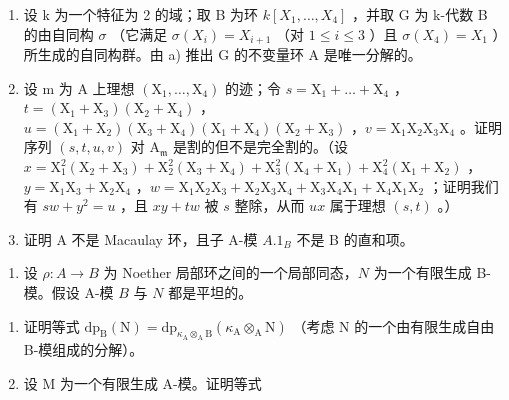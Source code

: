 \begin{enumerate}
\def\labelenumi{\alph{enumi})}
\setcounter{enumi}{1}
\item
  设 k 为一个特征为 2 的域；取 B 为环 \(k[X_{1},\ldots,X_{4}]\) ，并取 G 为 k-代数 B 的由自同构 \(\sigma\) （它满足 \(\sigma(X_{i})=X_{i+1}\) （对 \(1\leqslant i\leqslant3\) ）且 \(\sigma(X_{4})=X_{1}\) ）所生成的自同构群。由 a) 推出 G 的不变量环 A 是唯一分解的。
\item
  设 m 为 \(\mathrm{A}\) 上理想 \((\mathrm{X}_1, \ldots, \mathrm{X}_4)\) 的迹；令 \(s = \mathrm{X}_1 + \ldots + \mathrm{X}_4\) ，\(t = (\mathrm{X}_1 + \mathrm{X}_3)(\mathrm{X}_2 + \mathrm{X}_4)\) ，\(u = (\mathrm{X}_1 + \mathrm{X}_2)(\mathrm{X}_3 + \mathrm{X}_4)(\mathrm{X}_1 + \mathrm{X}_4)(\mathrm{X}_2 + \mathrm{X}_3)\) ，\(v = \mathrm{X}_1\mathrm{X}_2\mathrm{X}_3\mathrm{X}_4\) 。证明序列 \((s, t, u, v)\) 对 \(\mathrm{A}_{\mathfrak{m}}\) 是割的但不是完全割的。（设 \(x = \mathrm{X}_1^2(\mathrm{X}_2 + \mathrm{X}_3) + \mathrm{X}_2^2(\mathrm{X}_3 + \mathrm{X}_4) + \mathrm{X}_3^2(\mathrm{X}_4 + \mathrm{X}_1) + \mathrm{X}_4^2(\mathrm{X}_1 + \mathrm{X}_2)\) ，\(y = \mathrm{X}_1\mathrm{X}_3 + \mathrm{X}_2\mathrm{X}_4\) ，\(w = \mathrm{X}_1\mathrm{X}_2\mathrm{X}_3 + \mathrm{X}_2\mathrm{X}_3\mathrm{X}_4 + \mathrm{X}_3\mathrm{X}_4\mathrm{X}_1 + \mathrm{X}_4\mathrm{X}_1\mathrm{X}_2\) ；证明我们有 \(sw + y^2 = u\) ，且 \(xy + tw\) 被 \(s\) 整除，从而 \(ux\) 属于理想 \((s, t)\) 。）
\item
  证明 A 不是 Macaulay 环，且子 A-模 \(A.1_{B}\) 不是 B 的直和项。
\end{enumerate}


\begin{enumerate}
\def\labelenumi{\arabic{enumi})}
\tightlist
\item
  设 \(\rho: A \to B\) 为 Noether 局部环之间的一个局部同态，\(N\) 为一个有限生成 B-模。假设 A-模 \(B\) 与 \(N\) 都是平坦的。
\end{enumerate}

\begin{enumerate}
\def\labelenumi{\alph{enumi})}
\item
  证明等式 \(\mathrm{dp}_{\mathrm{B}}(\mathrm{N}) = \mathrm{dp}_{\kappa_{\mathrm{A}} \otimes_{\mathrm{A}} \mathrm{B}}(\kappa_{\mathrm{A}} \otimes_{\mathrm{A}} \mathrm{N})\) （考虑 N 的一个由有限生成自由 B-模组成的分解）。
\item
  设 M 为一个有限生成 A-模。证明等式
\end{enumerate}

